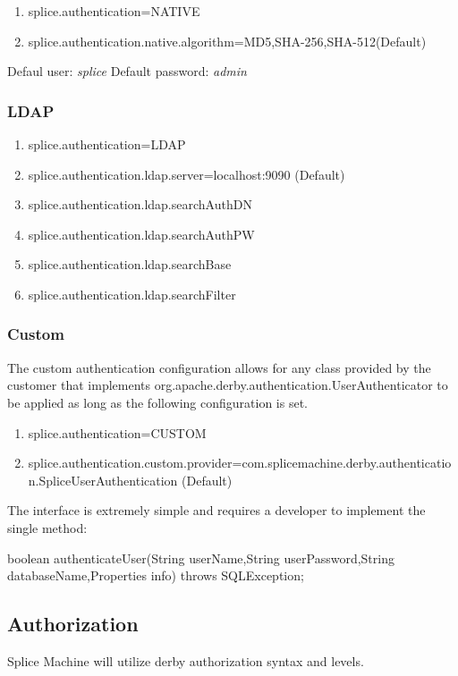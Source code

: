\begin{enumerate}
	\item splice.authentication=NATIVE
	\item splice.authentication.native.algorithm=MD5,SHA-256,SHA-512(Default)
\end{enumerate}

Defaul user:  \emph{splice}	
Default password: \emph{admin}

\subsubsection{LDAP}

\begin{enumerate}
	\item splice.authentication=LDAP
	\item splice.authentication.ldap.server=localhost:9090 (Default)
	\item splice.authentication.ldap.searchAuthDN
	\item splice.authentication.ldap.searchAuthPW
	\item splice.authentication.ldap.searchBase
	\item splice.authentication.ldap.searchFilter
\end{enumerate}

\subsubsection{Custom}

The custom authentication
configuration allows for any
class provided by the customer
that implements org.apache.derby.authentication.UserAuthenticator
to be applied as long as the following configuration is set.

\begin{enumerate}
	\item splice.authentication=CUSTOM
	\item	splice.authentication.custom.provider=com.splicemachine.derby.authentication.SpliceUserAuthentication (Default)
\end{enumerate}

The interface is extremely simple and requires a developer to implement the
single method:

boolean	authenticateUser(String userName,String userPassword,String
databaseName,Properties info) throws SQLException;


\subsection{Authorization}
Splice Machine will utilize derby authorization syntax and levels. 

